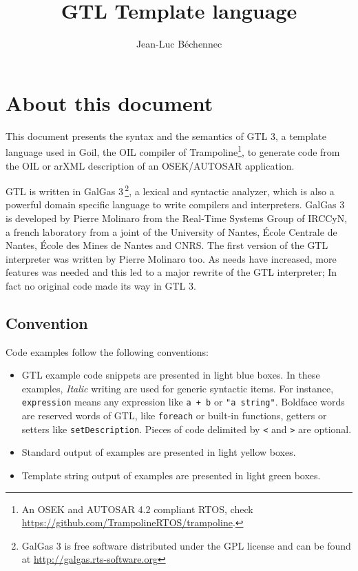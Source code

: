 \documentclass[10pt,openright,twosides]{report}
\title{GTL Template language}
\author{Jean-Luc B\'echennec}
\newcommand{\gtlinline}[1]{\colorbox{light-blue}{\lstinline[language=gtl]{#1}}}
\begin{document}
\maketitle

\tableofcontents

\chapter{About this document}

This document presents the syntax and the semantics of GTL 3, a template language used in Goil, the OIL compiler of Trampoline\footnote{An OSEK and AUTOSAR 4.2 compliant RTOS, check \url{https://github.com/TrampolineRTOS/trampoline}.}, to generate code from the OIL or arXML description of an OSEK/AUTOSAR application.

GTL is written in GalGas 3\,\footnote{GalGas 3 is free software distributed under the GPL license and can be found at \url{http://galgas.rts-software.org}}, a lexical and syntactic analyzer, which is also a powerful domain specific language to write compilers and interpreters. GalGas 3 is developed by Pierre Molinaro from the Real-Time Systems Group of IRCCyN, a french laboratory from a joint of the University of Nantes, \'Ecole Centrale de Nantes, \'Ecole des Mines de Nantes and CNRS. The first version of the GTL interpreter was written by Pierre Molinaro too. As needs have increased, more features was needed and this led to a major rewrite of the GTL interpreter; In fact no original code made its way in GTL 3.

\section*{Convention} 

Code examples follow the following conventions:
\begin{itemize}
\item GTL example code snippets are presented in \colorbox{light-blue}{light blue boxes}. In these examples, {\em Italic} writing are used for generic syntactic items. For instance, \gtlinline{expression} means any expression like \gtlinline{a + b} or \gtlinline{"a string"}. Boldface words are reserved words of GTL, like \gtlinline{foreach} or built-in functions, getters or setters like \gtlinline{setDescription}. Pieces of code delimited by \gtlinline{<} and \gtlinline{>} are optional.
\item Standard output of examples are presented in \colorbox{light-yellow}{light yellow boxes}.
\item Template string output of examples are presented in \colorbox{light-green}{light green boxes}.
\end{itemize}
\end{document}
